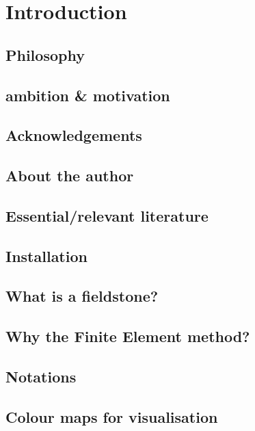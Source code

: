 \documentclass[a4paper]{article}
\begin{document}
\section{Introduction}

\subsection{Philosophy}  %
\subsection{ambition \& motivation}  %
\subsection{Acknowledgements}  %
\subsection{About the author}  %
\subsection{Essential/relevant literature}  %
\subsection{Installation}  %
\subsection{What is a fieldstone?}  %
\subsection{Why the Finite Element method?}  %
\subsection{Notations}  %
\subsection{Colour maps for visualisation}  %
\end{document}
